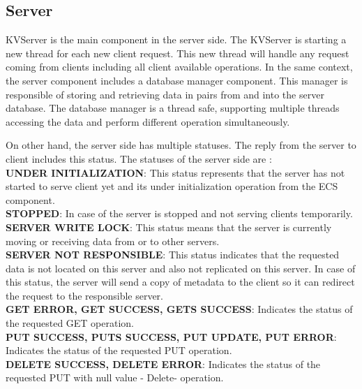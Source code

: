 \documentclass{sig-alternate}
\begin{document}
\subsection{Server}\label{serverimpl}
KVServer is the main component in the server side. The KVServer is starting a new thread for each new client request. This new thread will handle any request coming from clients including all client available operations.
In the same context, the server component includes a database manager component. This manager is responsible of storing and retrieving data in pairs from and into the server database. The database manager is a thread safe, supporting multiple threads accessing the data and perform different operation simultaneously. 

On other hand, the server side has multiple statuses. The reply from the server to client includes this status. The statuses of the server side are :\\
\textbf{UNDER INITIALIZATION}: This status represents that the server has not started to serve client yet and its under initialization operation from the ECS component.\\
\textbf{STOPPED}: In case of the server is stopped and not serving clients temporarily.\\
\textbf{SERVER WRITE LOCK}: This status means that the server is currently moving or receiving data from or to other servers.\\
\textbf{SERVER NOT RESPONSIBLE}: This status indicates that the requested data is not located on this server and also not replicated on this server. In case of this status, the server will send a copy of metadata to the client so it can redirect the request to the responsible server.\\
\textbf{GET ERROR, GET SUCCESS, GETS SUCCESS}: Indicates the status of the requested GET operation.\\
\textbf{PUT SUCCESS, PUTS SUCCESS, PUT UPDATE, PUT ERROR}: Indicates the status of the requested PUT operation.\\
\textbf{DELETE SUCCESS, DELETE ERROR}: Indicates the status of the requested PUT with null value - Delete- operation.


\end{document}
